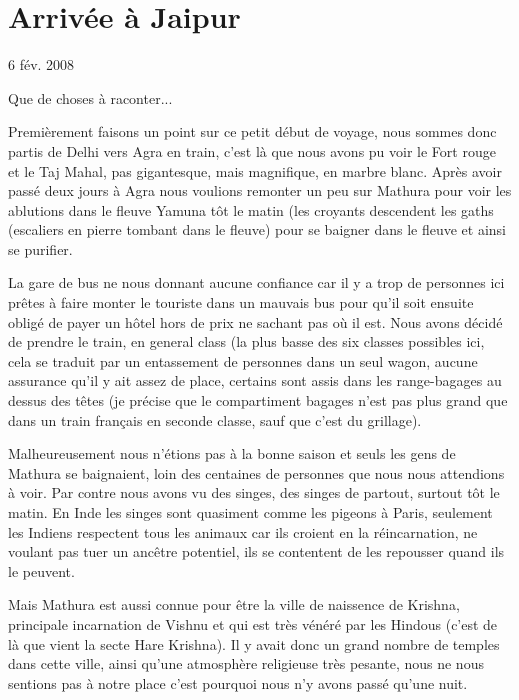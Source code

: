 \section{Arrivée à Jaipur}

6 fév. 2008

\begin{multicols}{2}

Que de choses à raconter...

Premièrement faisons un point sur ce petit début de voyage, nous sommes donc partis de Delhi vers Agra en train, c'est là que nous avons pu voir le Fort rouge et le Taj Mahal, pas gigantesque, mais magnifique, en marbre blanc. Après avoir passé deux jours à Agra nous voulions remonter un peu sur Mathura pour voir les ablutions dans le fleuve Yamuna tôt le matin (les croyants descendent les gaths (escaliers en pierre tombant dans le fleuve) pour se baigner dans le fleuve et ainsi se purifier.

La gare de bus ne nous donnant aucune confiance car il y a trop de personnes ici prêtes à faire monter le touriste dans un mauvais bus pour qu'il soit ensuite obligé de payer un hôtel hors de prix ne sachant pas où il est. Nous avons décidé de prendre le train, en general class (la plus basse des six classes possibles ici, cela se traduit par un entassement de personnes dans un seul wagon, aucune assurance qu'il y ait assez de place, certains sont assis dans les range-bagages au dessus des têtes (je précise que le compartiment bagages n'est pas plus grand que dans un train français en seconde classe, sauf que c'est du grillage).

Malheureusement nous n'étions pas à la bonne saison et seuls les gens de Mathura se baignaient, loin des centaines de personnes que nous nous attendions à voir. Par contre nous avons vu des singes, des singes de partout, surtout tôt le matin. En Inde les singes sont quasiment comme les pigeons à Paris, seulement les Indiens respectent tous les animaux car ils croient en la réincarnation, ne voulant pas tuer un ancêtre potentiel, ils se contentent de les repousser quand ils le peuvent.

Mais Mathura est aussi connue pour être la ville de naissence de Krishna, principale incarnation de Vishnu et qui est très vénéré par les Hindous (c'est de là que vient la secte Hare Krishna). Il y avait donc un grand nombre de temples dans cette ville, ainsi qu'une atmosphère religieuse très pesante, nous ne nous sentions pas à notre place c'est pourquoi nous n'y avons passé qu'une nuit.


\end{multicols}

